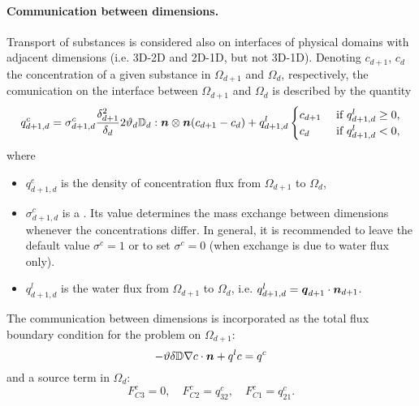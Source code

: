 \paragraph{Communication between dimensions.}
Transport of substances is considered also on interfaces of physical domains with adjacent dimensions (i.e. 3D-2D and 2D-1D, but not 3D-1D).
Denoting $c_{d+1}$, $c_d$ the concentration of a given substance in $\Omega_{d+1}$ and $\Omega_d$, respectively, the comunication on the interface between $\Omega_{d+1}$ and $\Omega_d$ is described by the quantity
\begin{equation}
  \label{e:inter_dim_flux}
  q^c_{d+1,d} = \sigma^c_{d+1,d} \frac{\delta_{d+1}^2}{\delta_d}2\th_d\D_d:\n\otimes\n ( c_{d+1} - c_d) + q^l_{d+1,d}\begin{cases} c_{d+1} & \mbox{ if }q^l_{d+1,d}\ge 0,\\ c_d & \mbox{ if }q^l_{d+1,d}<0,\end{cases}
\end{equation}
where
\begin{itemize}
\item $q^c_{d+1,d}$  is the density of concentration flux from $\Omega_{d+1}$ to $\Omega_d$,
\item $\sigma^c_{d+1,d}$ \units{}{}{} is a .
Its value determines the mass exchange between dimensions whenever the concentrations differ.
In general, it is recommended to leave the default value $\sigma^c=1$ or to set $\sigma^c=0$ (when exchange is due to water flux only).
\item $q^l_{d+1,d}$  is the water flux from $\Omega_{d+1}$ to $\Omega_d$, i.e. $q^l_{d+1,d} = \mathbf{\boldsymbol{q}}_{d+1}\cdot\mathbf{\boldsymbol{n}}_{d+1}$.
\end{itemize}
The communication between dimensions is incorporated as the total flux boundary condition for the problem on $\Omega_{d+1}$:
\begin{equation}
\label{e:FC}
-\th\delta\D\nabla c\cdot\vc n + q^l c = q^c
\end{equation}
and a source term in $\Omega_d$:
\begin{equation}
F^c_{C3} = 0,\quad
F^c_{C2} = q^c_{32},\quad
F^c_{C1} = q^c_{21}.
\end{equation}


